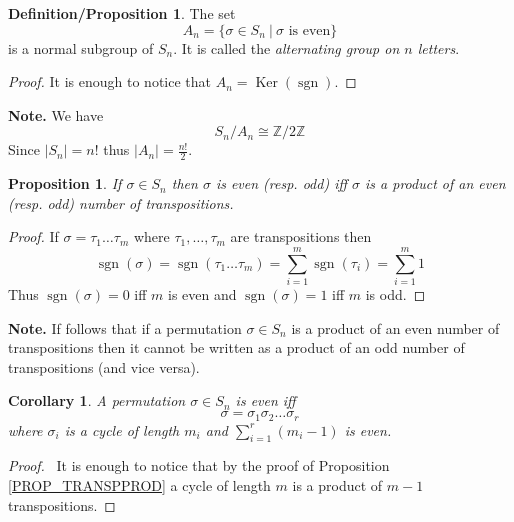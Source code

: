 \documentclass[12pt, letterpaper, oneside]{article}
\theoremstyle{plain}
\newtheorem{proposition}[theorem]{Proposition}
\newtheorem{corollary}[theorem]{Corollary}
\theoremstyle{definition}
\newtheorem{definition/proposition}[theorem]{Definition/Proposition}
\newcommand{\Z}{{\mathbb Z}}
\newcommand{\Ker}{\operatorname{Ker}}
\newcommand{\sgn}{\operatorname{sgn}}
\newcommand{\vs}{\vskip 5mm}
\begin{document}
\vs\vs\vs

\begin{definition/proposition}
The set 
$$A_{n} = \{ \sigma \in S_{n} \ | \ \sigma \text{ is even} \}$$
is a normal subgroup of $S_{n}$. It is called the 
\emph{alternating group on $n$ letters}.
\end{definition/proposition}

\vs

\begin{proof}
It is enough to notice that $A_{n} = \Ker(\sgn)$.
\end{proof}


\vs\vs

\textbf{Note.} We have 
$$S_{n}/A_{n} \cong \Z/2\Z$$ 
Since $|S_{n}| = n!$ thus $|A_{n}| = \frac{n!}{2}$.


\vs\vs

\begin{proposition}
If $\sigma\in S_{n}$ then $\sigma$ is even (resp. odd) iff $\sigma$ is a product 
of an even (resp. odd) number of transpositions. 
\end{proposition}

\vs

\begin{proof}
If $\sigma = \tau_{1}{\dots}\tau_{m}$ where $\tau_{1}, \dots, \tau_{m}$
are transpositions then 
$$\sgn(\sigma) = \sgn( \tau_{1}{\dots}\tau_{m}) = \sum_{i=1}^{m}\sgn(\tau_{i}) = \sum_{i=1}^{m}1$$
Thus $\sgn(\sigma) = 0$ iff $m$ is even and $\sgn(\sigma) = 1$ iff $m$ is odd.

\end{proof}


\vs\vs

\textbf{Note.} If follows that if a permutation $\sigma\in S_{n}$ is a product of an even 
number of transpositions then it cannot be written as a product of an odd number of transpositions
(and vice versa). 

\vs\vs

\begin{corollary}
A permutation $\sigma\in S_{n}$ is even iff
$$\sigma= \sigma_{1}\sigma_{2}{\dots}\sigma_{r}$$ 
where $\sigma_{i}$ is a cycle of length $m_{i}$ and  $\sum_{i=1}^{r}(m_{i} -1) $ is even.
\end{corollary}

\vs

\begin{proof} \ 
It is enough to notice that by the proof of Proposition \ref{PROP_TRANSPPROD} a cycle
of length $m$ is a product of $m-1$ transpositions.  
\end{proof}
\end{document}
